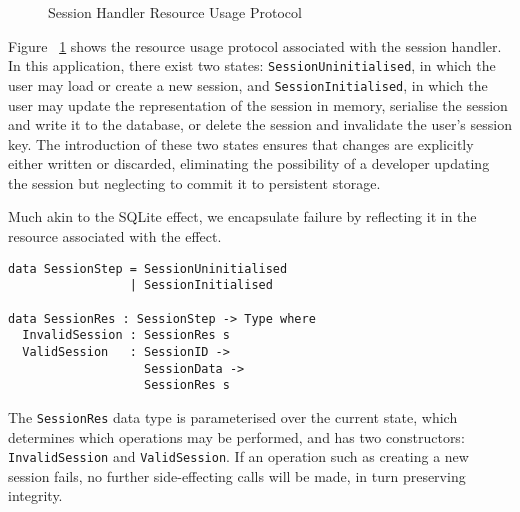 \documentclass[preprint]{sigplanconf}
\begin{document}
\begin{figure}[htpb!]
\centering
{}
\caption{Session Handler Resource Usage Protocol}
\label{fig:sessionstates}
\end{figure}

Figure ~\ref{fig:sessionstates} shows the resource usage protocol associated with the session handler. In this application, there exist two states: \texttt{SessionUninitialised}, in which the user may load or create a new session, and \texttt{SessionInitialised}, in which the user may update the representation of the session in memory, serialise the session and write it to the database, or delete the session and invalidate the user's session key. The introduction of these two states ensures that changes are explicitly either written or discarded, eliminating the possibility of a developer updating the session but neglecting to commit it to persistent storage.

Much akin to the SQLite effect, we encapsulate failure by reflecting it in the resource associated with the effect. 
{\small
\begin{verbatim}
data SessionStep = SessionUninitialised
                 | SessionInitialised

data SessionRes : SessionStep -> Type where
  InvalidSession : SessionRes s  
  ValidSession   : SessionID -> 
                   SessionData -> 
                   SessionRes s
\end{verbatim}
}
The \texttt{SessionRes} data type is parameterised over the current state, which determines which operations may be performed, and has two constructors: \texttt{InvalidSession} and \texttt{ValidSession}. If an operation such as creating a new session fails, no further side-effecting calls will be made, in turn preserving integrity. 
\end{document}
